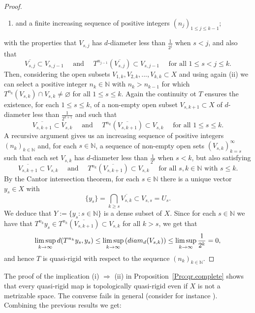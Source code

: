 \documentclass[openright,11pt]{article}
\theoremstyle{plain}
\theoremstyle{definition}
\newcommand{\NN}{\mathbb{N}}
\newcommand{\cl}{\overline}
\newcommand{\diam}{\textup{diam}}
\begin{document}
\begin{proof}
\begin{enumerate}[--]
		\item and a finite increasing sequence of positive integers $(n_j)_{1\leq j\leq k-1}$;
	\end{enumerate}
	with the properties that $V_{s,j}$ has $d$-diameter less than $\frac{1}{2^j}$ when $s<j$, and also that
	\[
	\cl{V_{s,j}} \subset V_{s,j-1} \quad \text{ and } \quad T^{n_{j-1}}\left(\cl{V_{s,j}}\right) \subset V_{s,j-1} \quad \text{ for all } 1\leq s < j \leq k.
	\]
	Then, considering the open subsets $V_{1,k}, V_{2,k}, ..., V_{k,k} \subset X$ and using again (ii) we can select a positive integer $n_k \in \NN$ with $n_k>n_{k-1}$ for which $T^{n_k}(V_{s,k}) \cap V_{s,k} \neq \varnothing$ for all $1\leq s\leq k$. Again the continuity ot $T$ ensures the existence, for each $1\leq s\leq k$, of a non-empty open subset $V_{s,k+1} \subset X$ of $d$-diameter less than $\frac{1}{2^{k+1}}$ and such that
	\[
	\cl{V_{s,k+1}} \subset V_{s,k} \quad \text{ and } \quad T^{n_{k}}\left(\cl{V_{s,k+1}}\right) \subset V_{s,k} \quad \text{ for all } 1\leq s\leq k.
	\]
	A recursive argument gives us an increasing sequence of positive integers $(n_k)_{k\in\NN}$ and, for each $s \in \NN$, a sequence of non-empty open sets $(V_{s,k})_{k=s}^{\infty}$ such that each set $V_{s,k}$ has $d$-diameter less than $\frac{1}{2^k}$ when $s<k$, but also satisfying
	\[
	\cl{V_{s,k+1}}\subset V_{s,k} \quad \text{ and } \quad  T^{n_k}\left(\cl{V_{s,k+1}}\right)\subset V_{s,k} \quad \text{ for all } s,k \in \NN \text{ with } s\leq k.
	\]
	By the Cantor intersection theorem, for each $s\in\NN$ there is a unique vector $y_s\in X$ with
	\[
	\{y_s\} = \bigcap_{k\geq s} \cl{V_{s,k}} \subset V_{s,s} = U_s.
	\]
	We deduce that $Y:=\{ y_s: s \in \NN \}$ is a dense subset of $X$. Since for each $s \in \NN$ we have that $T^{n_k}y_s \in T^{n_k}\left(\cl{V_{s,k+1}}\right) \subset V_{s,k}$ for all $k > s$, we get that
	\[
	\limsup_{k\to\infty} d(T^{n_k}y_s,y_s) \leq \limsup_{k\to\infty} \left(\diam_d(V_{s,k})\right) \leq \limsup_{k\to\infty} \frac{1}{2^k} = 0,
	\]
	and hence $T$ is quasi-rigid with respect to the sequence $(n_k)_{k\in\NN}$.
\end{proof}

The proof of the implication (i) $\Rightarrow$ (ii) in Proposition~\ref{Pro:qr.complete} shows that every quasi-rigid map is topologically quasi-rigid even if $X$ is not a metrizable space. The converse fails in general (consider for instance \cite[Example 12.9]{GrPe2011_book}). Combining the previous results we get:
\end{document}
